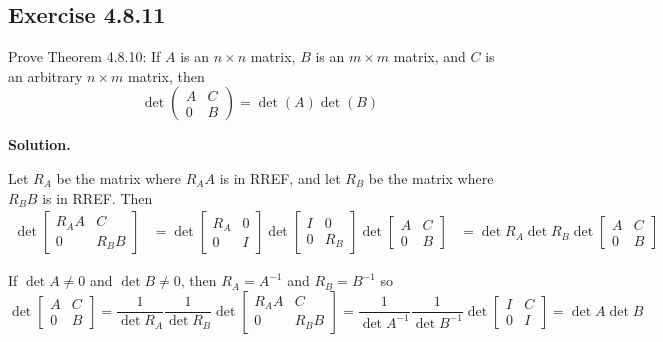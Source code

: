 \documentclass[12pt]{article}
\newcommand{\inv}{^{-1}}
\begin{document}
\subsection*{Exercise 4.8.11}
Prove Theorem 4.8.10: If $A$ is an $n\times n$ matrix, $B$ is an $m\times m$ matrix, and $C$ is an arbitrary $n\times m$ matrix, then
$$
\det\begin{pmatrix}
A&C\\0&B
\end{pmatrix}
=\det(A)\det(B)
$$

\medskip

\textbf{Solution.}

Let $R_A$ be the matrix where $R_A A$ is in RREF,
and let $R_B$ be the matrix where $R_BB$ is in RREF.
Then 
\begin{align*}
    \det \begin{bmatrix}
        R_A A & C \\
        0 & R_B B
    \end{bmatrix}
    &= \det \begin{bmatrix}
            R_A & 0 \\
            0 & I
        \end{bmatrix}
        \det \begin{bmatrix}
            I & 0 \\
            0 & R_B
        \end{bmatrix}
        \det \begin{bmatrix}
            A & C \\
            0 & B
        \end{bmatrix}
    &= \det R_A \det R_B
        \det \begin{bmatrix}
            A & C \\
            0 & B
        \end{bmatrix}
\end{align*}

If $\det A \neq 0$ and $\det B \neq 0$,
then $R_A = A\inv$ and $R_B = B\inv$ so 
\[
    \det \begin{bmatrix}
        A & C \\
        0 & B
    \end{bmatrix}
    =  \frac{1}{\det R_A}
        \frac{1}{\det R_B}
        \det \begin{bmatrix}
            R_A A & C \\
            0 & R_B B
        \end{bmatrix} 
    =  \frac{1}{\det A\inv}
        \frac{1}{\det B\inv}
        \det \begin{bmatrix}
            I & C \\
            0 & I
        \end{bmatrix} 
    = \det A \det B
\]
\end{document}
